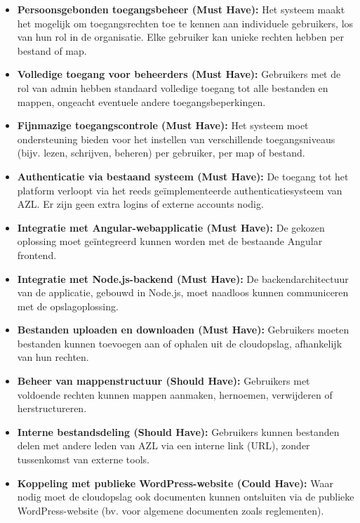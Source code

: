 \begin{itemize}
    \item \textbf{Persoonsgebonden toegangsbeheer (Must Have):} Het systeem maakt het mogelijk om toegangsrechten toe te kennen aan individuele gebruikers, los van hun rol in de organisatie. Elke gebruiker kan unieke rechten hebben per bestand of map.
    \item \textbf{Volledige toegang voor beheerders (Must Have):} Gebruikers met de rol van admin hebben standaard volledige toegang tot alle bestanden en mappen, ongeacht eventuele andere toegangsbeperkingen.
    \item \textbf{Fijnmazige toegangscontrole (Must Have):} Het systeem moet ondersteuning bieden voor het instellen van verschillende toegangsniveaus (bijv. lezen, schrijven, beheren) per gebruiker, per map of bestand.
    \item \textbf{Authenticatie via bestaand systeem (Must Have):} De toegang tot het platform verloopt via het reeds geïmplementeerde authenticatiesysteem van AZL. Er zijn geen extra logins of externe accounts nodig.
    \item \textbf{Integratie met Angular-webapplicatie (Must Have):} De gekozen oplossing moet geïntegreerd kunnen worden met de bestaande Angular frontend.
    \item \textbf{Integratie met Node.js-backend (Must Have):} De backendarchitectuur van de applicatie, gebouwd in Node.js, moet naadloos kunnen communiceren met de opslagoplossing.
    \item \textbf{Bestanden uploaden en downloaden (Must Have):} Gebruikers moeten bestanden kunnen toevoegen aan of ophalen uit de cloudopslag, afhankelijk van hun rechten.
    \item \textbf{Beheer van mappenstructuur (Should Have):} Gebruikers met voldoende rechten kunnen mappen aanmaken, hernoemen, verwijderen of herstructureren.
    \item \textbf{Interne bestandsdeling (Should Have):} Gebruikers kunnen bestanden delen met andere leden van AZL via een interne link (URL), zonder tussenkomst van externe tools.
    \item \textbf{Koppeling met publieke WordPress-website (Could Have):} Waar nodig moet de cloudopslag ook documenten kunnen ontsluiten via de publieke WordPress-website (bv. voor algemene documenten zoals reglementen).
\end{itemize}

